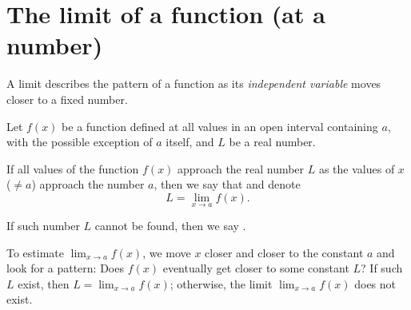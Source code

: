 \documentclass[../main.tex]{subfiles}
\begin{document}
 \section{The limit of a function (at a number)}
  A limit describes the pattern of a function as its \emph{independent variable} moves closer to a fixed number.

  \begin{mdframed}[style=withref-compact]
    Let \(f(x)\) be a function defined at all values in an open interval containing \(a\), with the possible exception of \(a\) itself, and \(L\) be a real number. 

    If all values of the function \(f(x)\) approach the real number \(L\) as the values of \(x\) (\(\ne a\)) approach the number \(a\), then we say that  and denote
    \[
      L = \lim_{x \to a} f(x).
    \]

    If such number \(L\) cannot be found, then we say .

  \end{mdframed}

  \faLightbulb{} To estimate \(\lim_{x \to a} f(x)\), we move \(x\) closer and closer to the constant \(a\) \underline{\hspace{6cm}} and look for a pattern: Does \(f(x)\) eventually get \underline{\hspace{3cm}} closer to some constant \(L\)? If such \(L\) exist, then \(L = \lim_{x \to a} f(x)\); otherwise, the limit \(\lim_{x \to a}f(x)\) does not exist.
\end{document}
